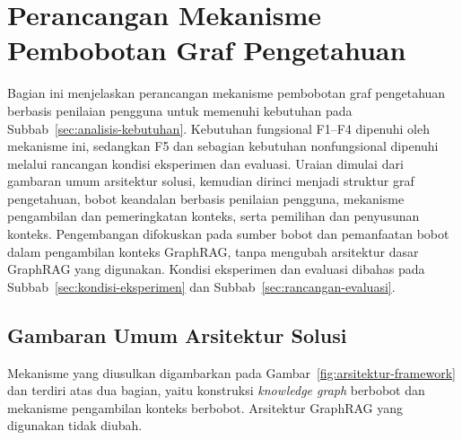 
\section{Perancangan Mekanisme Pembobotan Graf Pengetahuan}
\label{sec:perancangan-mekanisme}

Bagian ini menjelaskan perancangan mekanisme pembobotan graf pengetahuan berbasis penilaian pengguna untuk memenuhi kebutuhan pada Subbab~\ref{sec:analisis-kebutuhan}. Kebutuhan fungsional F1--F4 dipenuhi oleh mekanisme ini, sedangkan F5 dan sebagian kebutuhan nonfungsional dipenuhi melalui rancangan kondisi eksperimen dan evaluasi. Uraian dimulai dari gambaran umum arsitektur solusi, kemudian dirinci menjadi struktur graf pengetahuan, bobot keandalan berbasis penilaian pengguna, mekanisme pengambilan dan pemeringkatan konteks, serta pemilihan dan penyusunan konteks. Pengembangan difokuskan pada sumber bobot dan pemanfaatan bobot dalam pengambilan konteks GraphRAG, tanpa mengubah arsitektur dasar GraphRAG yang digunakan. Kondisi eksperimen dan evaluasi dibahas pada Subbab~\ref{sec:kondisi-eksperimen} dan Subbab~\ref{sec:rancangan-evaluasi}.

\subsection{Gambaran Umum Arsitektur Solusi}
\label{subsec:gambaran-umum-arsitektur}

Mekanisme yang diusulkan digambarkan pada Gambar~\ref{fig:arsitektur-framework} dan terdiri atas dua bagian, yaitu konstruksi \emph{knowledge graph} berbobot dan mekanisme pengambilan konteks berbobot. Arsitektur GraphRAG yang digunakan tidak diubah. 

